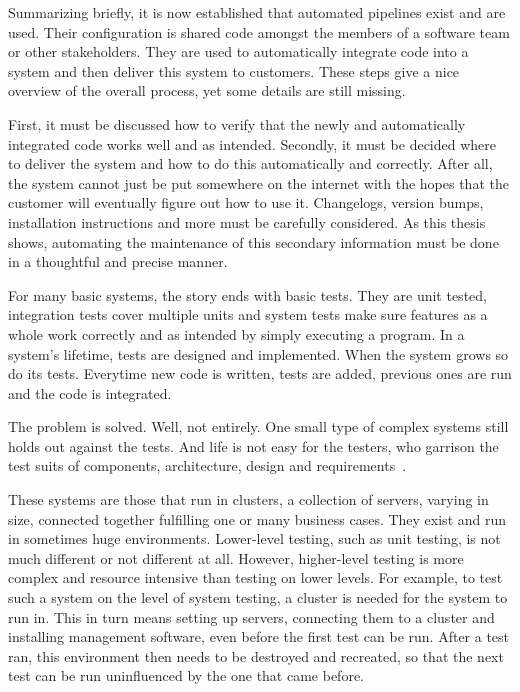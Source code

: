 Summarizing briefly, it is now established that automated pipelines exist and are used.
Their configuration is shared code amongst the members of a software team or other stakeholders.
They are used to automatically integrate code into a system and then deliver this system to customers.
These steps give a nice overview of the overall process, yet some details are still missing.

First, it must be discussed how to verify that the newly and automatically integrated code works well and as intended.
Secondly, it must be decided where to deliver the system and how to do this automatically and correctly.
After all, the system cannot just be put somewhere on the internet with the hopes that the customer will eventually figure out how to use it.
Changelogs, version bumps, installation instructions and more must be carefully considered.
As this thesis shows, automating the maintenance of this secondary information must be done in a thoughtful and precise manner.

For many basic systems, the story ends with basic tests.
They are unit tested, integration tests cover multiple units and system tests make sure features as a whole work correctly and as intended by simply executing a program.
In a system's lifetime, tests are designed and implemented.
When the system grows so do its tests.
Everytime new code is written, tests are added, previous ones are run and the code is integrated.

The problem is solved.
Well, not entirely.
One small type of complex systems still holds out against the tests.
And life is not easy for the testers, who garrison the test suits of components, architecture, design and requirements~\cite{AsterixBeginningSentence}.

\pagebreak

These systems are those that run in clusters, a collection of servers, varying in size, connected together fulfilling one or many business cases.
They exist and run in sometimes huge environments.
Lower-level testing, such as unit testing, is not much different or not different at all.
However, higher-level testing is more complex and resource intensive than testing on lower levels.
For example, to test such a system on the level of system testing, a cluster is needed for the system to run in.
This in turn means setting up servers, connecting them to a cluster and installing management software, even before the first test can be run.
After a test ran, this environment then needs to be destroyed and recreated, so that the next test can be run uninfluenced by the one that came before.

